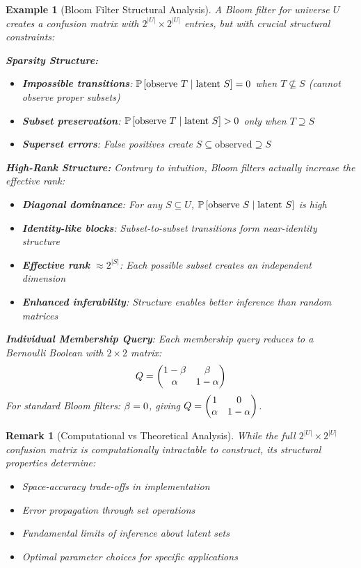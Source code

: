 \documentclass[11pt,final,hidelinks]{article}
\newtheorem{example}[theorem]{Example}
\newtheorem{remark}[theorem]{Remark}
\begin{document}
\begin{example}[Bloom Filter Structural Analysis]
A Bloom filter for universe $U$ creates a confusion matrix with $2^{|U|} \times 2^{|U|}$ entries, but with crucial structural constraints:

\textbf{Sparsity Structure:}
\begin{itemize}
    \item \textbf{Impossible transitions}: $\mathbb{P}\left[\text{observe } T \mid \text{latent } S\right] = 0$ when $T \not\subseteq S$ (cannot observe proper subsets)
    \item \textbf{Subset preservation}: $\mathbb{P}\left[\text{observe } T \mid \text{latent } S\right] > 0$ only when $T \supseteq S$
    \item \textbf{Superset errors}: False positives create $S \subseteq \text{observed} \supseteq S$
\end{itemize}

\textbf{High-Rank Structure:}
Contrary to intuition, Bloom filters actually \emph{increase} the effective rank:
\begin{itemize}
    \item \textbf{Diagonal dominance}: For any $S \subseteq U$, $\mathbb{P}\left[\text{observe } S \mid \text{latent } S\right]$ is high
    \item \textbf{Identity-like blocks}: Subset-to-subset transitions form near-identity structure
    \item \textbf{Effective rank} $\approx 2^{|S|}$: Each possible subset creates an independent dimension
    \item \textbf{Enhanced inferability}: Structure enables better inference than random matrices
\end{itemize}

\textbf{Individual Membership Query}: Each membership query reduces to a Bernoulli Boolean with $2 \times 2$ matrix:
$$Q = \begin{pmatrix} 1-\beta & \beta \\ \alpha & 1-\alpha \end{pmatrix}$$
For standard Bloom filters: $\beta = 0$, giving $Q = \begin{pmatrix} 1 & 0 \\ \alpha & 1-\alpha \end{pmatrix}$.
\end{example}

\begin{remark}[Computational vs Theoretical Analysis]
While the full $2^{|U|} \times 2^{|U|}$ confusion matrix is computationally intractable to construct, its structural properties determine:
\begin{itemize}
    \item Space-accuracy trade-offs in implementation
    \item Error propagation through set operations  
    \item Fundamental limits of inference about latent sets
    \item Optimal parameter choices for specific applications
\end{itemize}
\end{remark}
\end{document}
